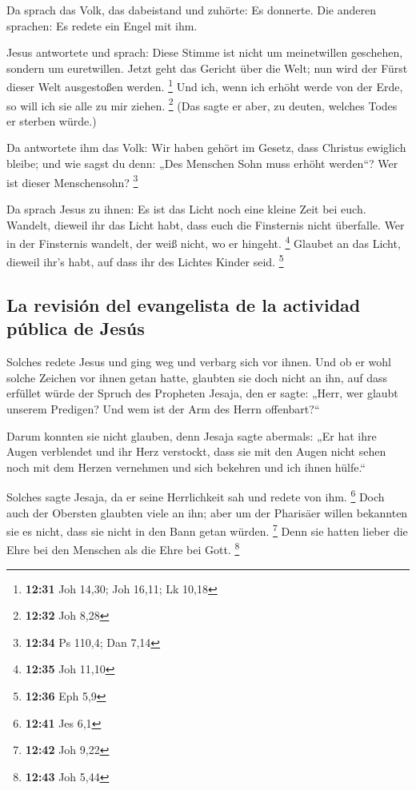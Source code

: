  Da sprach das Volk, das dabeistand und zuhörte: Es
donnerte. Die anderen sprachen: Es redete ein Engel mit ihm.

 Jesus antwortete und sprach: Diese Stimme ist nicht um
meinetwillen geschehen, sondern um euretwillen.  Jetzt
geht das Gericht über die Welt; nun wird der Fürst dieser Welt
ausgestoßen werden. \footnote{\textbf{12:31} Joh 14,30; Joh 16,11; Lk
  10,18}  Und ich, wenn ich erhöht werde von der Erde, so
will ich sie alle zu mir ziehen. \footnote{\textbf{12:32} Joh 8,28}
 (Das sagte er aber, zu deuten, welches Todes er sterben
würde.)

 Da antwortete ihm das Volk: Wir haben gehört im Gesetz,
dass Christus ewiglich bleibe; und wie sagst du denn: „Des Menschen Sohn
muss erhöht werden``? Wer ist dieser Menschensohn? \footnote{\textbf{12:34}
  Ps 110,4; Dan 7,14}

 Da sprach Jesus zu ihnen: Es ist das Licht noch eine
kleine Zeit bei euch. Wandelt, dieweil ihr das Licht habt, dass euch die
Finsternis nicht überfalle. Wer in der Finsternis wandelt, der weiß
nicht, wo er hingeht. \footnote{\textbf{12:35} Joh 11,10}
 Glaubet an das Licht, dieweil ihr's habt, auf dass ihr
des Lichtes Kinder seid. \footnote{\textbf{12:36} Eph 5,9}

\hypertarget{la-revisiuxf3n-del-evangelista-de-la-actividad-puxfablica-de-jesuxfas}{%
\subsection{La revisión del evangelista de la actividad pública de
Jesús}\label{la-revisiuxf3n-del-evangelista-de-la-actividad-puxfablica-de-jesuxfas}}

 Solches redete Jesus und ging weg und verbarg sich vor
ihnen. Und ob er wohl solche Zeichen vor ihnen getan hatte, glaubten sie
doch nicht an ihn,  auf dass erfüllet würde der Spruch
des Propheten Jesaja, den er sagte: „Herr, wer glaubt unserem Predigen?
Und wem ist der Arm des Herrn offenbart?{}``

 Darum konnten sie nicht glauben, denn Jesaja sagte
abermals:  „Er hat ihre Augen verblendet und ihr Herz
verstockt, dass sie mit den Augen nicht sehen noch mit dem Herzen
vernehmen und sich bekehren und ich ihnen hülfe.``

 Solches sagte Jesaja, da er seine Herrlichkeit sah und
redete von ihm. \footnote{\textbf{12:41} Jes 6,1}  Doch
auch der Obersten glaubten viele an ihn; aber um der Pharisäer willen
bekannten sie es nicht, dass sie nicht in den Bann getan würden.
\footnote{\textbf{12:42} Joh 9,22}  Denn sie hatten
lieber die Ehre bei den Menschen als die Ehre bei Gott. \footnote{\textbf{12:43}
  Joh 5,44}


